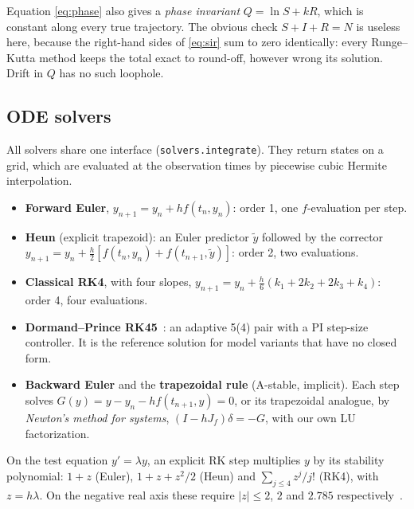 \documentclass[sigconf]{acmart}
\begin{document}
Equation \eqref{eq:phase} also gives a \emph{phase invariant}
$Q=\ln S+kR$, which is constant along every true trajectory. The obvious
check $S+I+R=N$ is useless here, because the right-hand sides of
\eqref{eq:sir} sum to zero identically: every Runge--Kutta method keeps
the total exact to round-off, however wrong its solution. Drift in $Q$
has no such loophole.

\subsection{ODE solvers}
\label{sec:solvers}
All solvers share one interface (\texttt{solvers.integrate}). They
return states on a grid, which are evaluated at the observation times by
piecewise cubic Hermite interpolation.
\begin{itemize}
  \item \textbf{Forward Euler}, $y_{n+1}=y_n+hf(t_n,y_n)$: order 1, one
    $f$-evaluation per step.
  \item \textbf{Heun} (explicit trapezoid): an Euler predictor
    $\tilde y$ followed by the corrector
    $y_{n+1}=y_n+\tfrac h2[f(t_n,y_n)+f(t_{n+1},\tilde y)]$: order 2, two
    evaluations.
  \item \textbf{Classical RK4}, with four slopes,
    $y_{n+1}=y_n+\tfrac h6(k_1+2k_2+2k_3+k_4)$: order 4, four
    evaluations.
  \item \textbf{Dormand--Prince RK45}~\cite{dormand1980}: an adaptive
    5(4) pair with a PI step-size controller. It is the reference
    solution for model variants that have no closed form.
  \item \textbf{Backward Euler} and the \textbf{trapezoidal rule}
    (A-stable, implicit). Each step solves
    $G(y)=y-y_n-h f(t_{n+1},y)=0$, or its trapezoidal analogue, by
    \emph{Newton's method for systems}, $(I-hJ_f)\delta=-G$, with our own
    LU factorization.
\end{itemize}
On the test equation $y'=\lambda y$, an explicit RK step multiplies $y$
by its stability polynomial: $1+z$ (Euler), $1+z+z^2/2$ (Heun) and
$\sum_{j\le4}z^j/j!$ (RK4), with $z=h\lambda$. On the negative real axis
these require $|z|\le2$, $2$ and $2.785$
respectively~\cite{hairer1993}.
\end{document}
